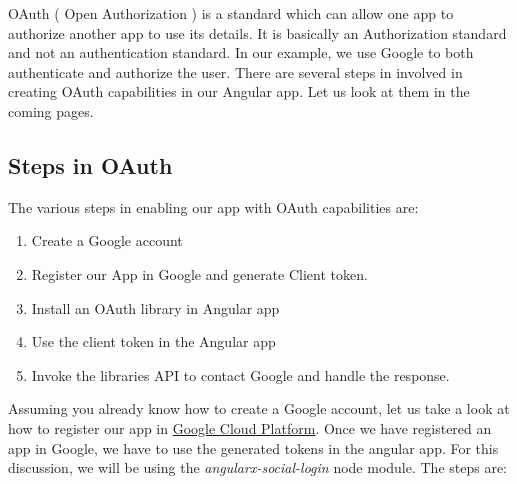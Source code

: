 \documentclass{report}
\begin{document}
OAuth ( Open Authorization ) is a standard which can allow one app to authorize another app to use its details. It is basically an Authorization standard and not an authentication standard. In our example, we use Google to both authenticate and authorize the user. There are several steps in involved in creating OAuth capabilities in our Angular app. Let us look at them in the coming pages.

\subsection{Steps in OAuth}
The various steps in enabling our app with OAuth capabilities are:
\begin{enumerate}
	\item{Create a Google account}
	\item{Register our App in Google and generate Client token.}
	\item{Install an OAuth library in Angular app}
	\item{Use the client token in the Angular app}
	\item{Invoke the libraries API to contact Google and handle the response.}
\end{enumerate}
Assuming you already know how to create a Google account, let us take a look at how to register our app in \href{https://console.cloud.google.com/}{Google Cloud Platform}.
Once we have registered an app in Google, we have to use the generated tokens in the angular app. For this discussion, we will be using the \textit{angularx-social-login} node module.
The steps are:
\end{document}
